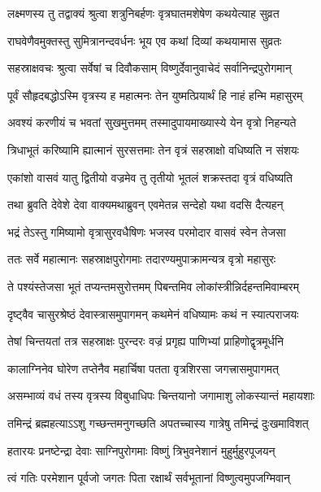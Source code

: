 
\twolineshloka
{लक्ष्मणस्य तु तद्वाक्यं श्रुत्वा शत्रुनिबर्हणः}
{वृत्रघातमशेषेण कथयेत्याह सुव्रत} %

\twolineshloka
{राघवेणैवमुक्तस्तु सुमित्रानन्दवर्धनः}
{भूय एव कथां दिव्यां कथयामास सुव्रतः} %

\twolineshloka
{सहस्राक्षवचः श्रुत्वा सर्वेषां च दिवौकसाम्}
{विष्णुर्देवानुवाचेदं सर्वानिन्द्रपुरोगमान्} %

\twolineshloka
{पूर्वं सौहृदबद्धोऽस्मि वृत्रस्य ह महात्मनः}
{तेन युष्मत्प्रियार्थं हि नाहं हन्मि महासुरम्} %

\twolineshloka
{अवश्यं करणीयं च भवतां सुखमुत्तमम्}
{तस्मादुपायमाख्यास्ये येन वृत्रो निहन्यते} %

\twolineshloka
{त्रिधाभूतं करिष्यामि ह्यात्मानं सुरसत्तमाः}
{तेन वृत्रं सहस्राक्षो वधिष्यति न संशयः} %

\twolineshloka
{एकांशो वासवं यातु द्वितीयो वज्रमेव तु}
{तृतीयो भूतलं शक्रस्तदा वृत्रं वधिष्यति} %

\twolineshloka
{तथा ब्रुवति देवेशे देवा वाक्यमथाब्रुवन्}
{एवमेतन्न सन्देहो यथा वदसि दैत्यहन्} %

\twolineshloka
{भद्रं तेऽस्तु गमिष्यामो वृत्रासुरवधैषिणः}
{भजस्व परमोदार वासवं स्वेन तेजसा} %

\twolineshloka
{ततः सर्वे महात्मानः सहस्राक्षपुरोगमाः}
{तदारण्यमुपाक्रामन्यत्र वृत्रो महासुरः} %

\twolineshloka
{ते पश्यंस्तेजसा भूतं तप्यन्तमसुरोत्तमम्}
{पिबन्तमिव लोकांस्त्रीन्निर्दहन्तमिवाम्बरम्} %

\twolineshloka
{दृष्ट्वैव चासुरश्रेष्ठं देवास्त्रासमुपागमन्}
{कथमेनं वधिष्यामः कथं न स्यात्पराजयः} %

\twolineshloka
{तेषां चिन्तयतां तत्र सहस्राक्षः पुरन्दरः}
{वज्रं प्रगृह्य पाणिभ्यां प्राहिणोद्वृत्रमूर्धनि} %

\twolineshloka
{कालाग्निनेव घोरेण तप्तेनैव महार्चिषा}
{पतता वृत्रशिरसा जगत्त्रासमुपागमत्} %

\twolineshloka
{असम्भाव्यं वधं तस्य वृत्रस्य विबुधाधिपः}
{चिन्तयानो जगामाशु लोकस्यान्तं महायशाः} %

\twolineshloka
{तमिन्द्रं ब्रह्महत्याऽऽशु गच्छन्तमनुगच्छति}
{अपतच्चास्य गात्रेषु तमिन्द्रं दुःखमाविशत्} %

\twolineshloka
{हतारयः प्रनष्टेन्द्रा देवाः साग्निपुरोगमाः}
{विष्णुं त्रिभुवनेशानं मुहुर्मुहुरपूजयन्} %

\twolineshloka
{त्वं गतिः परमेशान पूर्वजो जगतः पिता}
{रक्षार्थं सर्वभूतानां विष्णुत्वमुपजग्मिवान्} %

